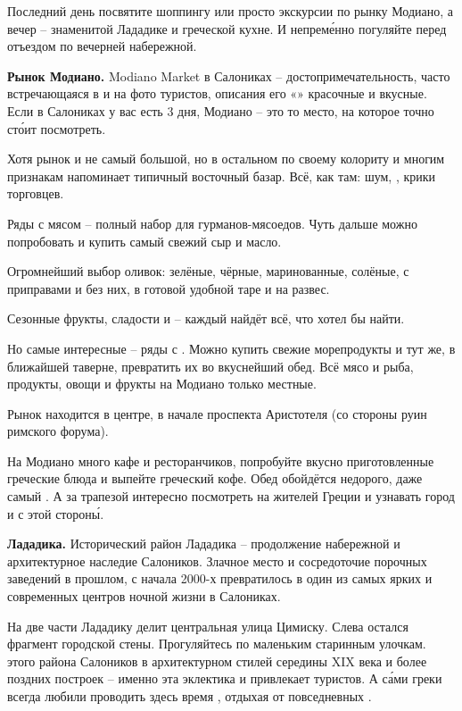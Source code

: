Последний день посвятите шоппингу или просто экскурсии по рынку Модиано, а вечер -- знаменитой Лададике и греческой кухне. И непрем\'{е}нно погуляйте перед отъездом по вечерней набережной.

\textbf{Рынок Модиано.} Modiano Market в Салониках – достопримечательность, часто встречающаяся в  и на фото туристов, описания его «» красочные и вкусные. Если в Салониках у вас есть 3 дня, Модиано – это то место, на которое точно ст\'{о}ит посмотреть.

Хотя рынок и не самый большой, но в остальном по своему колориту и многим признакам напоминает типичный восточный базар. Всё, как там: шум, , крики торговцев.

Ряды с мясом – полный набор для гурманов-мясоедов. Чуть дальше можно попробовать и купить самый свежий сыр и масло.

Огромнейший выбор оливок: зелёные, чёрные, маринованные, солёные, с приправами и без них, в готовой удобной таре и на развес.

Сезонные фрукты, сладости и  -- каждый найдёт всё, что хотел бы найти.

Но самые интересные -- ряды с . Можно купить свежие морепродукты и тут же, в ближайшей таверне, превратить их во вкуснейший обед. Всё мясо и рыба, продукты, овощи и фрукты на Модиано только местные.

Рынок находится в центре, в начале проспекта Аристотеля (со стороны руин римского форума).

На Модиано много кафе и ресторанчиков, попробуйте вкусно приготовленные греческие блюда и выпейте греческий кофе. Обед обойдётся недорого, даже самый . А за трапезой интересно посмотреть на  жителей Греции и узнавать город и с этой сторон\'{ы}.

\textbf{Лададика.}
Исторический район Лададика -- продолжение набережной и архитектурное наследие Салоников. Злачное место и сосредоточие порочных заведений в прошлом, с начала 2000-х превратилось в один из самых ярких и современных центров ночной жизни в Салониках.

На две части Лададику делит центральная улица Цимиску. Слева остался фрагмент городской стены. Прогуляйтесь по маленьким старинным улочкам.  этого района Салоников в архитектурном  стилей середины XIX века и более поздних построек -- именно эта эклектика и привлекает туристов. А с\'{а}ми греки всегда любили проводить здесь время , отдыхая от повседневных .

